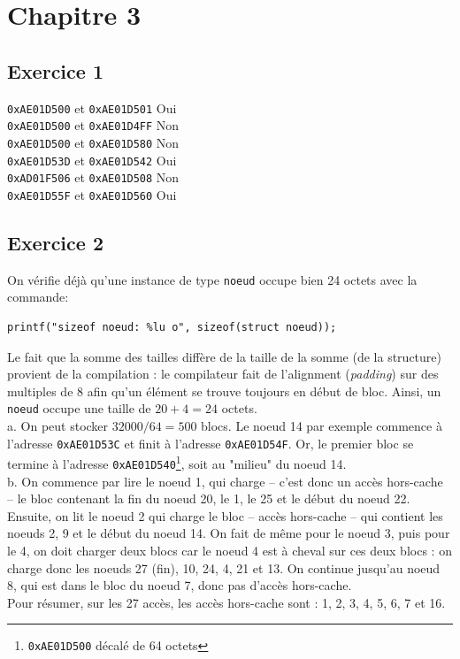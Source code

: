\documentclass[11pt, a4 paper]{article}
\begin{document}
\pagebreak

\section{Chapitre 3}
\subsection{Exercice 1}
\noindent
\texttt{0xAE01D500} et \texttt{0xAE01D501} \hfill Oui \hfill \\
\texttt{0xAE01D500} et \texttt{0xAE01D4FF} \hfill Non \hfill \\
\texttt{0xAE01D500} et \texttt{0xAE01D580} \hfill Non \hfill \\
\texttt{0xAE01D53D} et \texttt{0xAE01D542} \hfill Oui \hfill \\
\texttt{0xAD01F506} et \texttt{0xAE01D508} \hfill Non \hfill \\
\texttt{0xAE01D55F} et \texttt{0xAE01D560} \hfill Oui \hfill \\

\subsection{Exercice 2}
On vérifie déjà qu'une instance de type \texttt{noeud} occupe bien 24 octets avec la commande:\\
\begin{lstlisting}[style=CStyle]
printf("sizeof noeud: %lu o", sizeof(struct noeud));
\end{lstlisting}
Le fait que la somme des tailles diffère de la taille de la somme (de la structure) provient de la compilation : le compilateur fait de l'alignment (\textit{padding}) sur des multiples de 8 afin qu'un élément se trouve toujours en début de bloc. Ainsi, un \texttt{noeud} occupe une taille de $20+4=24$ octets.\\

a. On peut stocker $32000 / 64 = 500$ blocs. Le noeud 14 par exemple commence à l'adresse \texttt{0xAE01D53C} et finit à l'adresse \texttt{0xAE01D54F}. Or, le premier bloc se termine à l'adresse \texttt{0xAE01D540}\footnote{\texttt{0xAE01D500} décalé de 64 octets}, soit au "milieu" du noeud 14.\\

b. On commence par lire le noeud 1, qui charge -- c'est donc un accès hors-cache -- le bloc contenant la fin du noeud 20, le 1, le 25 et le début du noeud 22. Ensuite, on lit le noeud 2 qui charge le bloc -- accès hors-cache -- qui contient les noeuds 2, 9 et le début du noeud 14. On fait de même pour le noeud 3, puis pour le 4, on doit charger deux blocs car le noeud 4 est à cheval sur ces deux blocs : on charge donc les noeuds 27 (fin), 10, 24, 4, 21 et 13. On continue jusqu'au noeud 8, qui est dans le bloc du noeud 7, donc pas d'accès hors-cache.\\
Pour résumer, sur les 27 accès, les accès hors-cache sont : 1, 2, 3, 4, 5, 6, 7 et 16.
\end{document}

